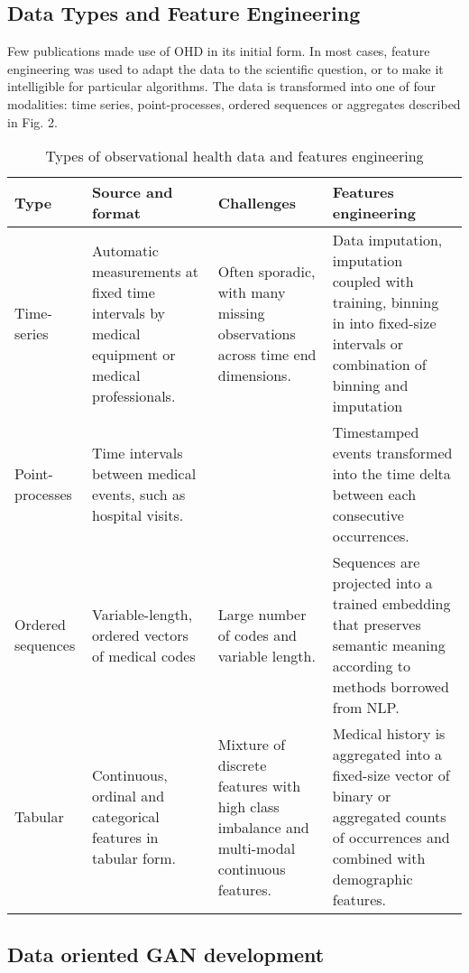 \subsection{Data Types and Feature Engineering}
Few publications made use of OHD in its initial form. In most cases, feature engineering was used to adapt the data to the scientific question, or to make it intelligible for particular algorithms. The data is transformed into one of four modalities: time series, point-processes, ordered sequences or aggregates described in Fig. 2.

\begin{table}
  \caption{Types of observational health data and features engineering}\label{tab:typeseng}
  
  \begin{tabular}{llll} \toprule
  
  Type & Source and format & Challenges & Features engineering\\ \midrule
  
  Time-series & Automatic measurements at fixed time intervals by medical equipment or medical professionals. & Often sporadic, with many missing observations across time end dimensions. & Data imputation, imputation coupled with training, binning in into fixed-size intervals or combination of binning and imputation\\
  Point-processes & Time intervals between medical events, such as hospital visits. & & Timestamped events transformed into the time delta between each consecutive occurrences.\\
  Ordered sequences & Variable-length, ordered vectors of medical codes & Large number of codes and variable length. & Sequences are projected into a trained embedding that preserves semantic meaning
  according to methods borrowed from NLP.\\
  Tabular & Continuous, ordinal and categorical features in tabular form. & Mixture of discrete features with high class imbalance and multi-modal continuous features. & Medical history is aggregated into a fixed-size vector of binary or aggregated counts of occurrences and combined with demographic features.\\
  \bottomrule
  \end{tabular}
\end{table}

\subsection{Data oriented GAN development}
